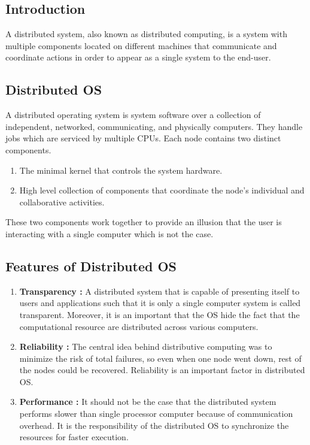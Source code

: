\documentclass{article}
\begin{document}
\subsection{Introduction}
A distributed system, also known as distributed computing, is a system with multiple components located on different machines that communicate and coordinate actions in order to appear as a single system to the end-user.
\subsection{Distributed OS}
A distributed operating system is system software over a collection of independent, networked, communicating, and physically computers. They handle jobs which are serviced by multiple CPUs. Each node contains two distinct components.
\begin{enumerate}
    \item The minimal kernel that controls the system hardware.
    \item High level collection of components that coordinate the node's individual and collaborative activities.
\end{enumerate}
These two components work together to provide an illusion that the user is interacting with a single computer which is not the case.
\subsection{Features of Distributed OS}
\begin{enumerate}
    \item \textbf{Transparency :} A distributed system that is capable of presenting itself to users and applications such that it is only a single computer system is called transparent. Moreover, it is an important that the OS hide the fact that the computational resource are distributed across various computers.
    \item \textbf{Reliability :} The central idea behind distributive computing was to minimize the risk of total failures, so even when one node went down, rest of the nodes could be recovered. Reliability is an important factor in distributed OS.
    \item \textbf{Performance :} It should not be the case that the distributed system performs slower than single processor computer because of communication overhead. It is the responsibility of the distributed OS to synchronize the resources for faster execution. 
\end{enumerate}
\end{document}
